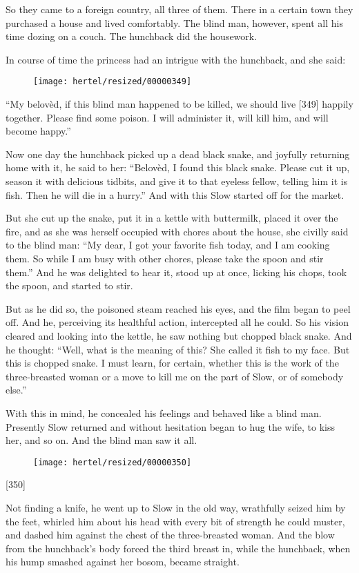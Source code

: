 \documentclass[article, twoside, 10pt]{memoir}
\begin{document}
So they came to a foreign country, all three of them. There in a
certain town they purchased a house and lived comfortably. The
blind man, however, spent all his time dozing on a couch. The
hunchback did the housework.

In course of time the princess had an intrigue with the hunchback,
and she said:
\begin{figure}[p]\texttt{[image: hertel/resized/00000349]}\end{figure}``My belovèd, if this blind man happened to be killed, we should live [349] happily together. Please find some poison. I will administer it, will kill him, and will become happy.''

Now one day the hunchback picked up a dead black snake, and
joyfully returning home with it, he said to her:
``Belovèd, I found this black snake. Please cut it up, season it with delicious tidbits, and give it to that eyeless fellow, telling him it is fish. Then he will die in a hurry.''
And with this Slow started off for the market.

But she cut up the snake, put it in a kettle with buttermilk,
placed it over the fire, and as she was herself occupied with
chores about the house, she civilly said to the blind man:
``My dear, I got your favorite fish today, and I am cooking them. So while I am busy with other chores, please take the spoon and stir them.''
And he was delighted to hear it, stood up at once, licking his
chops, took the spoon, and started to stir.

But as he did so, the poisoned steam reached his eyes, and the film
began to peel off. And he, perceiving its healthful action,
intercepted all he could. So his vision cleared and looking into
the kettle, he saw nothing but chopped black snake. And he thought:
``Well, what is the meaning of this? She called it fish to my face. But this is chopped snake. I must learn, for certain, whether this is the work of the three-breasted woman or a move to kill me on the part of Slow, or of somebody else.''

With this in mind, he concealed his feelings and behaved like a
blind man. Presently Slow returned and without hesitation began to
hug the wife, to kiss her, and so on. And the blind man saw it all.
\begin{figure}[p]\texttt{[image: hertel/resized/00000350]}\end{figure}[350]

Not finding a knife, he went up to Slow in the old way, wrathfully
seized him by the feet, whirled him about his head with every bit
of strength he could muster, and dashed him against the chest of
the three-breasted woman. And the blow from the hunchback's body
forced the third breast in, while the hunchback, when his hump
smashed against her bosom, became straight.
\end{document}
